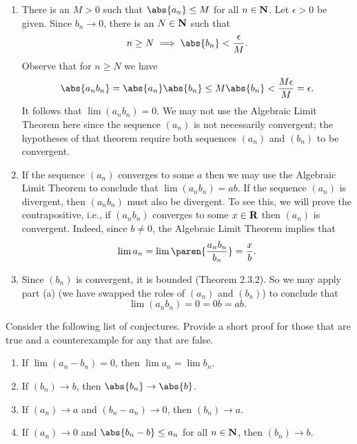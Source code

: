 \documentclass{lew98_solutions}
\begin{document}
\begin{solution}
    \begin{enumerate}
        \item There is an \( M > 0 \) such that \( \abs{a_n} \leq M \) for all \( n \in \mathbf{N} \). Let \( \epsilon > 0 \) be given. Since \( b_n \to 0 \), there is an \( N \in \mathbf{N} \) such that
        \[
            n \geq N \implies \abs{b_n} < \frac{\epsilon}{M}.
        \]
        Observe that for \( n \geq N \) we have
        \[
            \abs{a_n b_n} = \abs{a_n} \abs{b_n} \leq M \abs{b_n} < \frac{M \epsilon}{M} = \epsilon.
        \]
        It follows that \( \lim (a_n b_n) = 0 \). We may not use the Algebraic Limit Theorem here since the sequence \( (a_n) \) is not necessarily convergent; the hypotheses of that theorem require both sequences \( (a_n) \) and \( (b_n) \) to be convergent.

        \item If the sequence \( (a_n) \) converges to some \( a \) then we may use the Algebraic Limit Theorem to conclude that \( \lim (a_n b_n) = ab \). If the sequence \( (a_n) \) is divergent, then \( (a_n b_n) \) must also be divergent. To see this, we will prove the contrapositive, i.e., if \( (a_n b_n) \) converges to some \( x \in \mathbf{R} \) then \( (a_n) \) is convergent. Indeed, since \( b \neq 0 \), the Algebraic Limit Theorem implies that
        \[
            \lim a_n = \lim \paren{ \frac{a_n b_n}{b_n} } = \frac{x}{b}.
        \]

        \item Since \( (b_n) \) is convergent, it is bounded (Theorem 2.3.2). So we may apply part (a) (we have swapped the roles of \( (a_n) \) and \( (b_n) \)) to conclude that
        \[
            \lim (a_n b_n) = 0 = 0b = ab.
        \]
    \end{enumerate}
\end{solution}

\begin{exercise}
\label{ex:2.3.10}
    Consider the following list of conjectures. Provide a short proof for those that are true and a counterexample for any that are false.
    \begin{enumerate}
        \item If \( \lim (a_n - b_n) = 0 \), then \( \lim a_n = \lim b_n \).

        \item If \( (b_n) \to b \), then \( \abs{b_n} \to \abs{b} \).

        \item If \( (a_n) \to a \) and \( (b_n - a_n) \to 0 \), then \( (b_n) \to a \).

        \item If \( (a_n) \to 0 \) and \( \abs{b_n - b} \leq a_n \) for all \( n \in \mathbf{N} \), then \( (b_n) \to b \).
    \end{enumerate}
\end{exercise}
\end{document}
